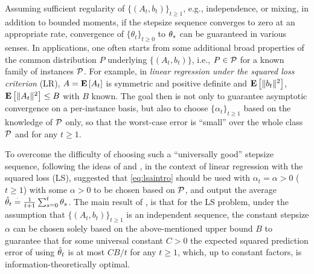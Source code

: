 Assuming sufficient regularity of $\{(A_t,b_t)\}_{t\ge 1}$, e.g., independence, or mixing, in addition to bounded moments, if the stepsize sequence converges to zero at an appropriate rate,
convergence of $\{\theta_t\}_{t\ge 0}$ to $\theta_*$ can be guaranteed in various senses. 
In applications, one often starts from some additional broad properties of the common distribution
$P$ underlying $\{(A_t,b_t)\}$, i.e., $P\in \mathcal{P}$ for a known family of instances $\mathcal{P}$.
For example, in \emph{linear regression under the squared loss criterion} (LR), 
$A= \mathbf{E}\left[A_t\right]$ is symmetric and positive definite and $\mathbf{E}\left[\| b_t\|^2\right]$, 
$\mathbf{E}\left[\| A_t\|^2\right]\le B$ with $B$ known.
The goal then is not only to guarantee asymptotic convergence on a per-instance basis, 
but also to choose $\{\alpha_t\}_{t\ge 1}$ based on the knowledge of $\mathcal{P}$ only, 
so that the worst-case error is  ``small'' 
over the whole class $\mathcal{P}$ and for any  $t\ge 1$.

To overcome the difficulty of choosing such a ``universally good'' stepsize sequence,
following the ideas of \citet{ruppert} and \citet{polyak-judisky},
in the context of linear regression with the squared loss (LS),
\citet{bach-moulines} suggested that
\eqref{eq:lsaintro} should be used with $\alpha_t=\alpha>0$ ($t\ge 1$) 
with some $\alpha>0$ to be chosen based on $\mathcal{P}$, 
and output the average $\hat{\theta}_t\stackrel{\cdot}{=}\frac{1}{t+1}\sum_{s=0}^t \theta_s$. 
The main result of 
\citet{bach-moulines}, 
is that for the LS problem, 
under the assumption that $\{(A_t,b_t)\}_{t\ge 1}$ is an independent sequence, 
the constant stepsize $\alpha$ can be chosen solely based on the above-mentioned 
upper bound $B$ to guarantee that for some universal constant $C>0$
the expected squared prediction error of using $\hat{\theta}_t$ is at most $C B/t$ for any $t\ge 1$,
which, up to constant factors, is information-theoretically optimal. 

